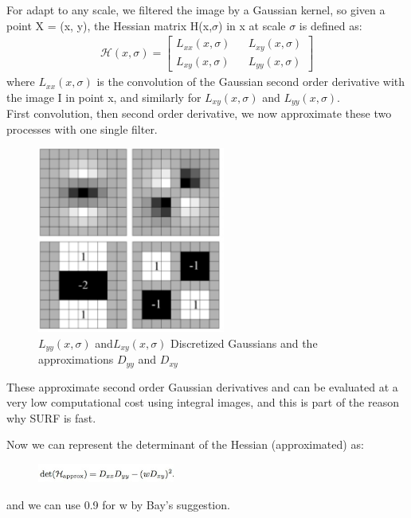 For adapt to any scale, we filtered the image by a Gaussian kernel, so given a point X = (x, y), the Hessian matrix H(x,$\sigma$) in x at scale $\sigma$ is defined as:
\begin{gather}
 \mathcal{H}(x,\sigma) =
\begin{bmatrix}
                 {L_{xx}(x,\sigma)}  && {L_{xy}(x,\sigma)} \\
                 {L_{xy}(x,\sigma)} && {L_{yy}(x,\sigma)}
\end{bmatrix}
\end{gather}
where ${L_{xx}(x,\sigma)}$ is the convolution of the Gaussian second order derivative with the image I in point x, and similarly for ${L_{xy}(x,\sigma)}$ and ${L_{yy}(x,\sigma)}$.\\
First convolution, then second order derivative, we now approximate these two processes with one single filter.\\


\begin{figure}[H]
\centering
\includegraphics[width=0.55\textwidth]{img/surf4.PNG}
\caption{${L_{yy}(x,\sigma)}$ and${L_{xy}(x,\sigma)}$ Discretized
Gaussians and the approximations $D_{yy}$ and $D_{xy}$}
\label{fig:surf1}
\end{figure}

These approximate second order Gaussian derivatives and can be evaluated at a very low computational cost using integral images, and this is part of the reason why SURF is fast.

Now we can represent the determinant of the Hessian (approximated) as:

\begin{figure}[H]
\centering
\includegraphics[width= 0.4\textwidth]{img/det.jpeg}

\label{fig:surfdet}
\end{figure}
and we can use 0.9 for w by Bay’s suggestion.

